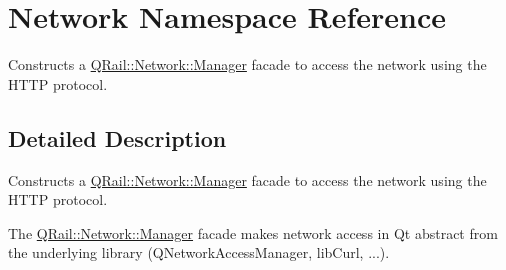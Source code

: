 \hypertarget{namespaceNetwork}{}\section{Network Namespace Reference}
\label{namespaceNetwork}


Constructs a \mbox{\hyperlink{classQRail_1_1Network_1_1Manager}{Q\+Rail\+::\+Network\+::\+Manager}} facade to access the network using the H\+T\+TP protocol.  




\subsection{Detailed Description}
Constructs a \mbox{\hyperlink{classQRail_1_1Network_1_1Manager}{Q\+Rail\+::\+Network\+::\+Manager}} facade to access the network using the H\+T\+TP protocol. 

The \mbox{\hyperlink{classQRail_1_1Network_1_1Manager}{Q\+Rail\+::\+Network\+::\+Manager}} facade makes network access in Qt abstract from the underlying library (Q\+Network\+Access\+Manager, lib\+Curl, ...). 
